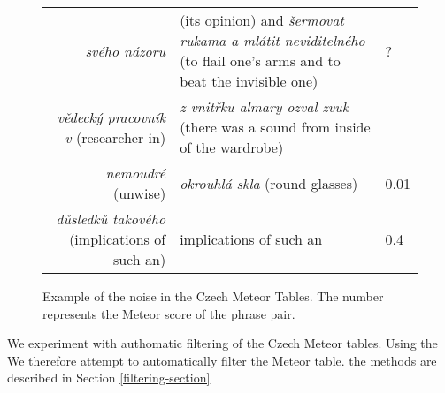 \begin{figure*}[tb]
\begin{center}

	  \begin{tabular}{rll}
  	\textit{svého názoru}  & (its opinion) and \textit{šermovat rukama a mlátit neviditelného} (to flail one's arms and to beat the invisible one) & ?\\
  	\textit{vědecký pracovník v} (researcher in)  & \textit{z vnitřku almary ozval zvuk} (there was a sound from inside of the wardrobe) & \\
    \textit{nemoudré} (unwise) & \textit{okrouhlá skla} (round glasses) & 0.01\\
   	\textit{důsledků takového} (implications of such an) & implications of such an & 0.4\\ 
   	\end{tabular}

\caption{Example of the noise in the Czech Meteor Tables. The number represents the Meteor score of the phrase pair.}
\label{meteor_noise}
\end{center}
\end{figure*}

We experiment with authomatic filtering of the Czech Meteor tables. Using the 
We therefore attempt to automatically filter the Meteor table.  the methods are described in Section \ref{filtering-section}


